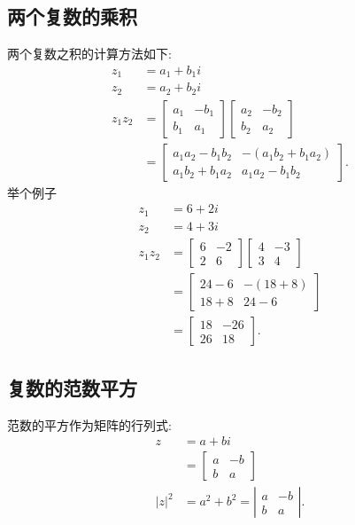 \subsection{两个复数的乘积}
两个复数之积的计算方法如下:
$$
\begin{aligned}
z_{1} & =a_{1}+b_{1} i \\
z_{2} & =a_{2}+b_{2} i \\
z_{1} z_{2} & =\left[\begin{array}{cc}
a_{1} & -b_{1} \\
b_{1} & a_{1}
\end{array}\right]\left[\begin{array}{cc}
a_{2} & -b_{2} \\
b_{2} & a_{2}
\end{array}\right] \\
& =\left[\begin{array}{cc}
a_{1} a_{2}-b_{1} b_{2} & -\left(a_{1} b_{2}+b_{1} a_{2}\right) \\
a_{1} b_{2}+b_{1} a_{2} & a_{1} a_{2}-b_{1} b_{2}
\end{array}\right] .
\end{aligned}
$$
举个例子
$$
\begin{aligned}
z_{1} & =6+2 i \\
z_{2} & =4+3 i \\
z_{1} z_{2} & =\left[\begin{array}{cc}
6 & -2 \\
2 & 6
\end{array}\right]\left[\begin{array}{cc}
4 & -3 \\
3 & 4
\end{array}\right] \\
& =\left[\begin{array}{cc}
24-6 & -(18+8) \\
18+8 & 24-6
\end{array}\right] \\
& =\left[\begin{array}{cc}
18 & -26 \\
26 & 18
\end{array}\right] .
\end{aligned}
$$

\subsection{复数的范数平方}
范数的平方作为矩阵的行列式:
$$
\begin{aligned}
z & =a+b i \\
& =\left[\begin{array}{cc}
a & -b \\
b & a
\end{array}\right] \\
|z|^{2} & =a^{2}+b^{2}=\left|\begin{array}{cc}
a & -b \\
b & a
\end{array}\right| .
\end{aligned}
$$

